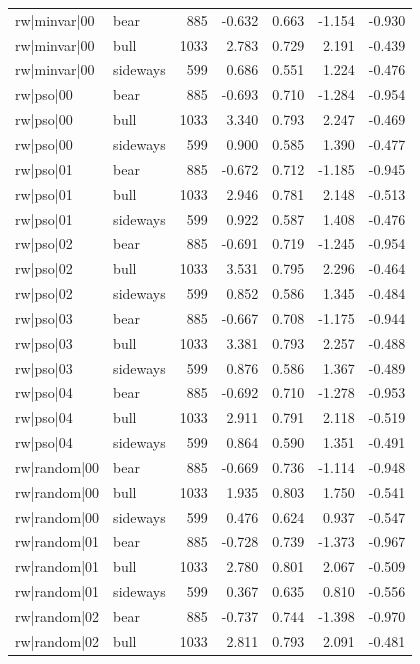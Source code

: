 \begin{table}
\begin{tabular}{llrrrrr}
rw|minvar|00 & bear & 885 & -0.632 & 0.663 & -1.154 & -0.930 \\
rw|minvar|00 & bull & 1033 & 2.783 & 0.729 & 2.191 & -0.439 \\
rw|minvar|00 & sideways & 599 & 0.686 & 0.551 & 1.224 & -0.476 \\
rw|pso|00 & bear & 885 & -0.693 & 0.710 & -1.284 & -0.954 \\
rw|pso|00 & bull & 1033 & 3.340 & 0.793 & 2.247 & -0.469 \\
rw|pso|00 & sideways & 599 & 0.900 & 0.585 & 1.390 & -0.477 \\
rw|pso|01 & bear & 885 & -0.672 & 0.712 & -1.185 & -0.945 \\
rw|pso|01 & bull & 1033 & 2.946 & 0.781 & 2.148 & -0.513 \\
rw|pso|01 & sideways & 599 & 0.922 & 0.587 & 1.408 & -0.476 \\
rw|pso|02 & bear & 885 & -0.691 & 0.719 & -1.245 & -0.954 \\
rw|pso|02 & bull & 1033 & 3.531 & 0.795 & 2.296 & -0.464 \\
rw|pso|02 & sideways & 599 & 0.852 & 0.586 & 1.345 & -0.484 \\
rw|pso|03 & bear & 885 & -0.667 & 0.708 & -1.175 & -0.944 \\
rw|pso|03 & bull & 1033 & 3.381 & 0.793 & 2.257 & -0.488 \\
rw|pso|03 & sideways & 599 & 0.876 & 0.586 & 1.367 & -0.489 \\
rw|pso|04 & bear & 885 & -0.692 & 0.710 & -1.278 & -0.953 \\
rw|pso|04 & bull & 1033 & 2.911 & 0.791 & 2.118 & -0.519 \\
rw|pso|04 & sideways & 599 & 0.864 & 0.590 & 1.351 & -0.491 \\
rw|random|00 & bear & 885 & -0.669 & 0.736 & -1.114 & -0.948 \\
rw|random|00 & bull & 1033 & 1.935 & 0.803 & 1.750 & -0.541 \\
rw|random|00 & sideways & 599 & 0.476 & 0.624 & 0.937 & -0.547 \\
rw|random|01 & bear & 885 & -0.728 & 0.739 & -1.373 & -0.967 \\
rw|random|01 & bull & 1033 & 2.780 & 0.801 & 2.067 & -0.509 \\
rw|random|01 & sideways & 599 & 0.367 & 0.635 & 0.810 & -0.556 \\
rw|random|02 & bear & 885 & -0.737 & 0.744 & -1.398 & -0.970 \\
rw|random|02 & bull & 1033 & 2.811 & 0.793 & 2.091 & -0.481 \\

\end{tabular}
\end{table}
